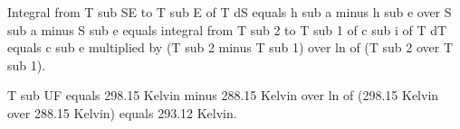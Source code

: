 Integral from T sub SE to T sub E of T dS equals h sub a minus h sub e over S sub a minus S sub e equals integral from T sub 2 to T sub 1 of c sub i of T dT equals c sub e multiplied by (T sub 2 minus T sub 1) over ln of (T sub 2 over T sub 1).

T sub UF equals 298.15 Kelvin minus 288.15 Kelvin over ln of (298.15 Kelvin over 288.15 Kelvin) equals 293.12 Kelvin.